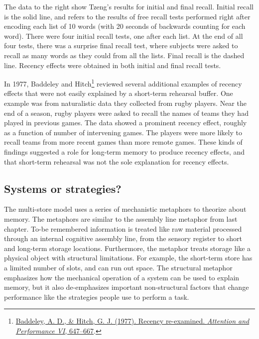 \documentclass[
  oneside,
  12pt]{crumpbook}
\begin{document}
The data to the right show Tzeng's results for initial and final recall. Initial recall is the solid line, and refers to the results of free recall tests performed right after encoding each list of 10 words (with 20 seconds of backwards counting for each word). There were four initial recall tests, one after each list. At the end of all four tests, there was a surprise final recall test, where subjects were asked to recall as many words as they could from all the lists. Final recall is the dashed line. Recency effects were obtained in both initial and final recall tests.

In 1977, Baddeley and Hitch\footnote{\protect\hyperlink{ref-baddeleyRecencyReexamined1977}{Baddeley, A. D., \& Hitch, G. J. (1977). Recency re-examined. \emph{Attention and Performance VI}, 647--667}.} reviewed several additional examples of recency effects that were not easily explained by a short-term rehearsal buffer. One example was from naturalistic data they collected from rugby players. Near the end of a season, rugby players were asked to recall the names of teams they had played in previous games. The data showed a prominent recency effect, roughly as a function of number of intervening games. The players were more likely to recall teams from more recent games than more remote games. These kinds of findings suggested a role for long-term memory to produce recency effects, and that short-term rehearsal was not the sole explanation for recency effects.

\hypertarget{systems-or-strategies}{%
\subsection{Systems or strategies?}\label{systems-or-strategies}}

The multi-store model uses a series of mechanistic metaphors to theorize about memory. The metaphors are similar to the assembly line metaphor from last chapter. To-be remembered information is treated like raw material processed through an internal cognitive assembly line, from the sensory register to short and long-term storage locations. Furthermore, the metaphor treats storage like a physical object with structural limitations. For example, the short-term store has a limited number of slots, and can run out space. The structural metaphor emphasizes how the mechanical operation of a system can be used to explain memory, but it also de-emphasizes important non-structural factors that change performance like the strategies people use to perform a task.
\end{document}
